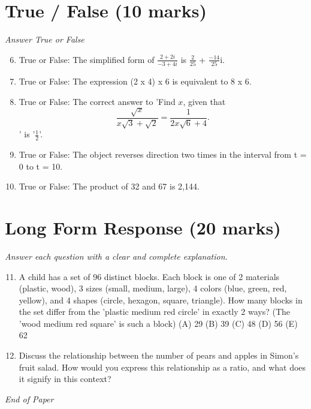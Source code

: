\documentclass[12pt]{article}
\begin{document}
\section*{True / False (10 marks)}
\textit{Answer True or False}
\begin{enumerate}[label=\arabic*.]
\setcounter{enumi}{5}
\item True or False: The simplified form of \ensuremath{\frac{2+2 i}{-3+4 i}} is \ensuremath{\frac{2}{25}} + \ensuremath{\frac{-14}{25}}i.
\item True or False: The expression (2 x 4) x 6 is equivalent to 8 x 6.
\item True or False: The correct answer to 'Find $x$, given that\[\dfrac{\sqrt{x}}{x\sqrt{3}+\sqrt{2}} = \dfrac{1}{2 x\sqrt{6}+4}.\]' is '\ensuremath{\frac{1}{2}}'.
\item True or False: The object reverses direction two times in the interval from t = 0 to t = 10.
\item True or False: The product of 32 and 67 is 2,144.
\end{enumerate}

\section*{Long Form Response (20 marks)}
\textit{Answer each question with a clear and complete explanation.}
\begin{enumerate}[label=\arabic*.]
\setcounter{enumi}{10}
\item A child has a set of 96 distinct blocks. Each block is one of 2 materials (plastic, wood), 3 sizes (small, medium, large), 4 colors (blue, green, red, yellow), and 4 shapes (circle, hexagon, square, triangle). How many blocks in the set differ from the 'plastic medium red circle' in exactly 2 ways? (The 'wood medium red square' is such a block) (A) 29 (B) 39 (C) 48 (D) 56 (E) 62
\item Discuss the relationship between the number of pears and apples in Simon's fruit salad. How would you express this relationship as a ratio, and what does it signify in this context?
\end{enumerate}

\vfill
\noindent\textit{End of Paper}
\end{document}
